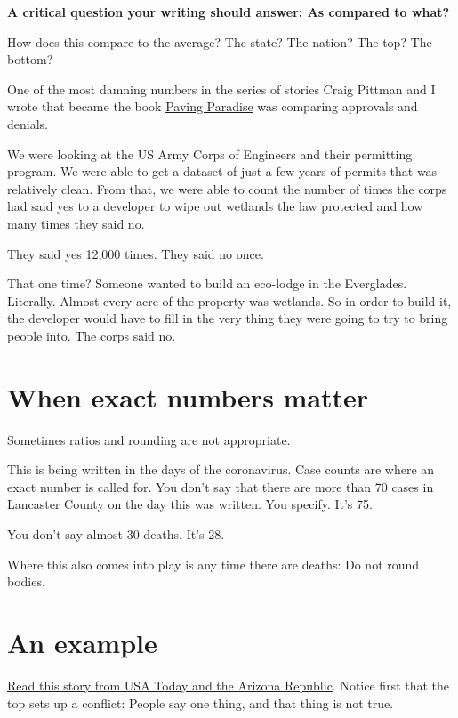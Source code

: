 \documentclass[]{book}
\begin{document}
\textbf{A critical question your writing should answer: As compared to what?}

How does this compare to the average? The state? The nation? The top? The bottom?

One of the most damning numbers in the series of stories Craig Pittman and I wrote that became the book \href{https://www.amazon.com/Paving-Paradise-Floridas-Vanishing-Wetlands-ebook/dp/B004HZXZCE}{Paving Paradise} was comparing approvals and denials.

We were looking at the US Army Corps of Engineers and their permitting program. We were able to get a dataset of just a few years of permits that was relatively clean. From that, we were able to count the number of times the corps had said yes to a developer to wipe out wetlands the law protected and how many times they said no.

They said yes 12,000 times. They said no once.

That one time? Someone wanted to build an eco-lodge in the Everglades. Literally. Almost every acre of the property was wetlands. So in order to build it, the developer would have to fill in the very thing they were going to try to bring people into. The corps said no.

\hypertarget{when-exact-numbers-matter}{%
\section{When exact numbers matter}\label{when-exact-numbers-matter}}

Sometimes ratios and rounding are not appropriate.

This is being written in the days of the coronavirus. Case counts are where an exact number is called for. You don't say that there are more than 70 cases in Lancaster County on the day this was written. You specify. It's 75.

You don't say almost 30 deaths. It's 28.

Where this also comes into play is any time there are deaths: Do not round bodies.

\hypertarget{an-example}{%
\section{An example}\label{an-example}}

\href{https://www.azcentral.com/in-depth/news/local/arizona-wildfires/2019/07/22/wildfire-risks-more-than-500-spots-have-greater-hazard-than-paradise/1434502001/}{Read this story from USA Today and the Arizona Republic}. Notice first that the top sets up a conflict: People say one thing, and that thing is not true.
\end{document}
